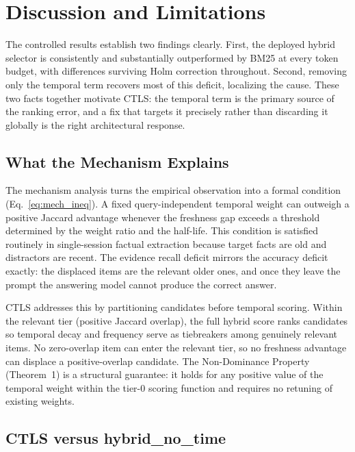 \section{Discussion and Limitations}

\label{sec:discussion}

The controlled results establish two findings clearly. First, the deployed hybrid selector is consistently and substantially outperformed by BM25 at every token budget, with differences surviving Holm correction throughout. Second, removing only the temporal term recovers most of this deficit, localizing the cause. These two facts together motivate CTLS: the temporal term is the primary source of the ranking error, and a fix that targets it precisely rather than discarding it globally is the right architectural response.

\subsection{What the Mechanism Explains}

The mechanism analysis turns the empirical observation into a formal condition (Eq.~\ref{eq:mech_ineq}). A fixed query-independent temporal weight can outweigh a positive Jaccard advantage whenever the freshness gap exceeds a threshold determined by the weight ratio and the half-life. This condition is satisfied routinely in single-session factual extraction because target facts are old and distractors are recent. The evidence recall deficit mirrors the accuracy deficit exactly: the displaced items are the relevant older ones, and once they leave the prompt the answering model cannot produce the correct answer.

CTLS addresses this by partitioning candidates before temporal scoring. Within the relevant tier (positive Jaccard overlap), the full hybrid score ranks candidates so temporal decay and frequency serve as tiebreakers among genuinely relevant items. No zero-overlap item can enter the relevant tier, so no freshness advantage can displace a positive-overlap candidate. The Non-Dominance Property (Theorem~1) is a structural guarantee: it holds for any positive value of the temporal weight within the tier-0 scoring function and requires no retuning of existing weights.

\subsection{CTLS versus hybrid\_no\_time}

